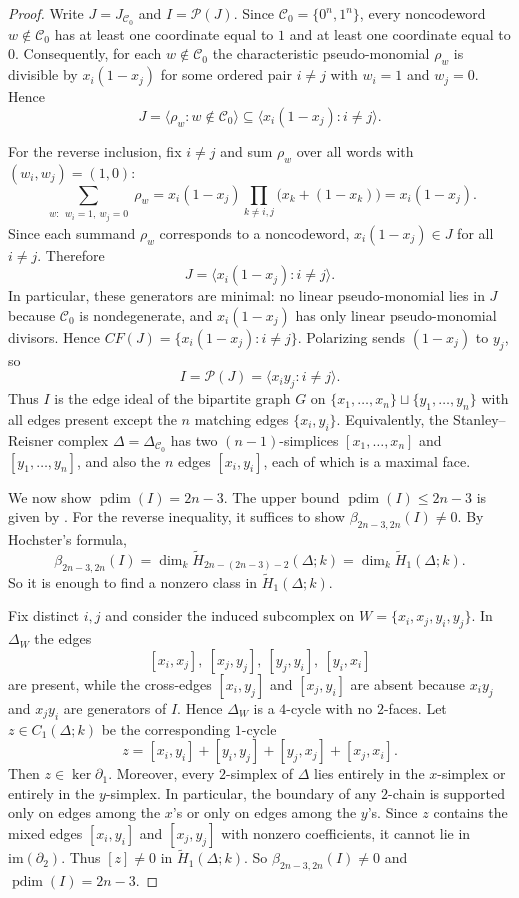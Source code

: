 \documentclass[12pt]{amsart}
\theoremstyle{remark}
\theoremstyle{definition}
\DeclareMathOperator{\pd}{pdim}
\newcommand{\C}{\mathcal{C}}
\def\P{{\mathcal P}}
\begin{document}
\begin{proof}
Write $J=J_{\C_0}$ and $I=\P(J)$.
Since $\C_0=\{0^n,1^n\}$, every noncodeword $w\notin\C_0$ has at least one coordinate equal to $1$ and
at least one coordinate equal to $0$. Consequently, for each $w\notin\C_0$ the characteristic
pseudo-monomial $\rho_w$ is divisible by $x_i(1-x_j)$ for some ordered pair $i\neq j$ with
$w_i=1$ and $w_j=0$. Hence
\[
J=\langle \rho_w : w\notin\C_0\rangle \subseteq \langle x_i(1-x_j) : i\neq j\rangle.
\]

For the reverse inclusion, fix $i\neq j$ and sum $\rho_w$ over all words with $(w_i,w_j)=(1,0)$:
\[
\sum_{\substack{w:~~ w_i=1,~ w_j=0}}\rho_w
=
x_i(1-x_j)\prod_{k\neq i,j}\bigl(x_k+(1-x_k)\bigr)
=
x_i(1-x_j).
\]
Since each summand $\rho_w$ corresponds to a noncodeword, $x_i(1-x_j)\in J$ for all $i\neq j$. Therefore
\[
J=\langle x_i(1-x_j): i\neq j\rangle.
\]
In particular, these generators are minimal: no linear pseudo-monomial lies in $J$ because $\C_0$ is
nondegenerate, and $x_i(1-x_j)$ has only linear pseudo-monomial divisors. Hence
$CF(J)=\{x_i(1-x_j): i\neq j\}$. Polarizing sends $(1-x_j)$ to $y_j$, so
\[
I=\P(J)=\langle x_i y_j : i\neq j\rangle.
\]
Thus $I$ is the edge ideal of the bipartite graph $G$ on
$\{x_1,\dots,x_n\}\sqcup\{y_1,\dots,y_n\}$ with all edges present except the $n$ matching edges
$\{x_i,y_i\}$.
Equivalently, the Stanley--Reisner complex $\Delta=\Delta_{\C_0}$ has two $(n-1)$-simplices
$[x_1,\dots,x_n]$ and $[y_1,\dots,y_n]$, and also the $n$ edges $[x_i,y_i]$, each of which is a maximal
face.

We now show $\pd(I)=2n-3$. The upper bound $\pd(I)\le 2n-3$ is given by .
For the reverse inequality, it suffices to show $\beta_{2n-3,2n}(I)\neq 0$. By Hochster's formula,
\[
\beta_{2n-3,2n}(I)=\dim_k\widetilde H_{2n-(2n-3)-2}(\Delta;k)=\dim_k\widetilde H_{1}(\Delta;k).
\]
So it is enough to find a nonzero class in $\widetilde H_1(\Delta;k)$.

Fix distinct $i,j$ and consider the induced subcomplex on
$W=\{x_i,x_j,y_i,y_j\}$. In $\Delta_W$ the edges
\[
[x_i,x_j],\ [x_j,y_j],\ [y_j,y_i],\ [y_i,x_i]
\]
are present, while the cross-edges $[x_i,y_j]$ and $[x_j,y_i]$ are absent because
$x_i y_j$ and $x_j y_i$ are generators of $I$. Hence $\Delta_W$ is a $4$-cycle with no $2$-faces. Let
$z\in C_1(\Delta;k)$ be the corresponding $1$-cycle
\[
z=[x_i,y_i]+[y_i,y_j]+[y_j,x_j]+[x_j,x_i].
\]
Then $z\in\ker\partial_1$. Moreover, every $2$-simplex of $\Delta$ lies entirely in the $x$-simplex
or entirely in the $y$-simplex. In particular, the boundary of any $2$-chain is supported only on edges
among the $x$'s or only on edges among the $y$'s. Since $z$ contains the mixed edges $[x_i,y_i]$ and
$[x_j,y_j]$ with nonzero coefficients, it cannot lie in $\mathrm{im}(\partial_2)$. Thus $[z]\neq 0$ in
$\widetilde H_1(\Delta;k)$. So $\beta_{2n-3,2n}(I)\neq 0$ and $\pd(I)=2n-3$.


\end{proof}
\end{document}

